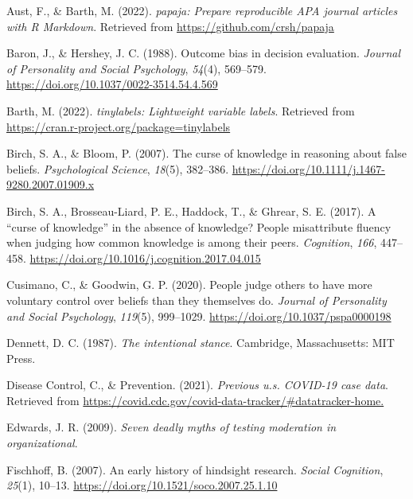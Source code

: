\documentclass[
  man,floatsintext]{apa6}
\newlength{\cslhangindent}
\newlength{\cslentryspacingunit} %
\newenvironment{CSLReferences}[2] %
 {%
  \setlength{\parindent}{0pt}
  \ifodd #1
  \let\oldpar\par
  \def\par{\hangindent=\cslhangindent\oldpar}
  \fi
  \setlength{\parskip}{#2\cslentryspacingunit}
 }%
 {}
\begin{document}
\hypertarget{refs}{}
\begin{CSLReferences}{1}{0}
\leavevmode{}%
Aust, F., \& Barth, M. (2022). \emph{{papaja}: {Prepare} reproducible {APA} journal articles with {R Markdown}}. Retrieved from \url{https://github.com/crsh/papaja}

\leavevmode{}%
Baron, J., \& Hershey, J. C. (1988). Outcome bias in decision evaluation. \emph{Journal of Personality and Social Psychology}, \emph{54}(4), 569--579. \url{https://doi.org/10.1037/0022-3514.54.4.569}

\leavevmode{}%
Barth, M. (2022). \emph{{tinylabels}: Lightweight variable labels}. Retrieved from \url{https://cran.r-project.org/package=tinylabels}

\leavevmode{}%
Birch, S. A., \& Bloom, P. (2007). The curse of knowledge in reasoning about false beliefs. \emph{Psychological Science}, \emph{18}(5), 382--386. \url{https://doi.org/10.1111/j.1467-9280.2007.01909.x}

\leavevmode{}%
Birch, S. A., Brosseau-Liard, P. E., Haddock, T., \& Ghrear, S. E. (2017). A {``curse of knowledge''} in the absence of knowledge? People misattribute fluency when judging how common knowledge is among their peers. \emph{Cognition}, \emph{166}, 447--458. \url{https://doi.org/10.1016/j.cognition.2017.04.015}

\leavevmode{}%
Cusimano, C., \& Goodwin, G. P. (2020). People judge others to have more voluntary control over beliefs than they themselves do. \emph{Journal of Personality and Social Psychology}, \emph{119}(5), 999--1029. \url{https://doi.org/10.1037/pspa0000198}

\leavevmode{}%
Dennett, D. C. (1987). \emph{The intentional stance}. Cambridge, Massachusetts: MIT Press.

\leavevmode{}%
Disease Control, C., \& Prevention. (2021). \emph{Previous u.s. COVID-19 case data}. Retrieved from \url{https://covid.cdc.gov/covid-data-tracker/\#datatracker-home.}

\leavevmode{}%
Edwards, J. R. (2009). \emph{Seven deadly myths of testing moderation in organizational}.

\leavevmode{}%
Fischhoff, B. (2007). An early history of hindsight research. \emph{Social Cognition}, \emph{25}(1), 10--13. \url{https://doi.org/10.1521/soco.2007.25.1.10}


\end{CSLReferences}
\end{document}
